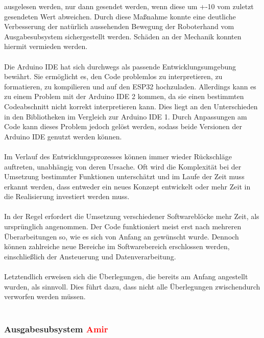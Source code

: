 \documentclass[titlepage,12pt,twoside]{article}
\begin{document}
ausgelesen werden, nur dann gesendet werden, wenn diese um +-10 vom zuletzt 
gesendeten Wert abweichen. Durch diese Maßnahme konnte eine deutliche 
Verbesserung der natürlich aussehenden Bewegung der Roboterhand vom 
Ausgabesubsystem sichergestellt werden. Schäden an der Mechanik konnten hiermit vermieden werden. \\
\\
Die Arduino IDE hat sich durchwegs als passende Entwicklungsumgebung bewährt. 
Sie ermöglicht es, den Code problemlos zu interpretieren, zu formatieren, zu 
kompilieren und auf den ESP32 hochzuladen. Allerdings kann es zu einem Problem 
mit der Arduino IDE 2 kommen, da sie einen bestimmten Codeabschnitt nicht 
korrekt interpretieren kann. Dies liegt an den Unterschieden in den Bibliotheken 
im Vergleich zur Arduino IDE 1. Durch Anpassungen am Code kann dieses Problem 
jedoch gelöst werden, sodass beide Versionen der Arduino IDE genutzt werden 
können. \\
\\
Im Verlauf des Entwicklungsprozesses können immer wieder Rückschläge auftreten, 
unabhängig von deren Ursache. Oft wird die Komplexität bei der Umsetzung 
bestimmter Funktionen unterschätzt und im Laufe der Zeit muss erkannt werden, 
dass entweder ein neues Konzept entwickelt oder mehr Zeit in die Realisierung 
investiert werden muss. \\
\\
In der Regel erfordert die Umsetzung verschiedener Softwareblöcke mehr Zeit, 
als ursprünglich angenommen. Der Code funktioniert meist erst nach mehreren 
Überarbeitungen so, wie es sich von Anfang an gewünscht wurde. Dennoch können 
zahlreiche neue Bereiche im Softwarebereich erschlossen werden, einschließlich 
der Ansteuerung und Datenverarbeitung. \\
\\
Letztendlich erweisen sich die Überlegungen, die bereits am Anfang angestellt 
wurden, als sinnvoll. Dies führt dazu, dass nicht alle Überlegungen 
zwischendurch verworfen werden müssen. \\
\\

\subsubsection{Ausgabesubsystem \textcolor{red}{Amir}}
\end{document}
